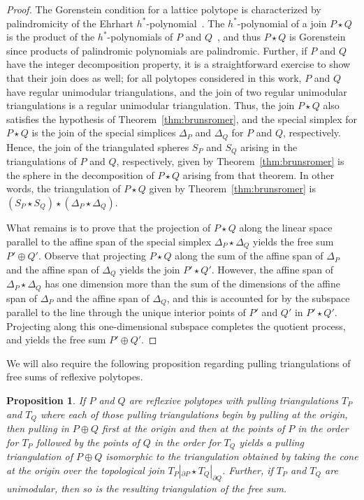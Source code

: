 \documentclass[12pt]{amsart}
\newtheorem{proposition}[theorem]{Proposition}
\theoremstyle{definition}
\begin{document}
\begin{proof}
The Gorenstein condition for a lattice polytope is characterized by palindromicity of the Ehrhart $h^*$-polynomial~\cite{stanleyhilbertgraded}.
The $h^*$-polynomial of a join $P\star Q$ is the product of the $h^*$-polynomials of $P$ and $Q$~\cite{BR07}, and thus $P\star Q$ is Gorenstein since products of palindromic polynomials are palindromic.
Further, if $P$ and $Q$ have the integer decomposition property, it is a straightforward exercise to show that their join does as well; for all polytopes considered in this work, $P$ and $Q$ have regular unimodular triangulations, and the join of two regular unimodular triangulations is a regular unimodular triangulation.
Thus, the join $P\star Q$ also satisfies the hypothesis of Theorem~\ref{thm:brunsromer}, and the special simplex for $P\star Q$ is the join of the special simplices $\Delta_P$ and $\Delta_Q$ for $P$ and $Q$, respectively.
Hence, the join of the triangulated spheres $S_P$ and $S_Q$ arising in the triangulations of $P$ and $Q$, respectively, given by Theorem~\ref{thm:brunsromer} is the sphere in the decomposition of $P\star Q$ arising from that theorem.
In other words, the triangulation of $P\star Q$ given by Theorem~\ref{thm:brunsromer} is $(S_P\star S_Q)\star (\Delta_P\star \Delta_Q)$.

What remains is to prove that the projection of $P\star Q$ along the linear space parallel to the affine span of the special simplex $\Delta_P\star \Delta_Q$ yields the free sum $P'\oplus Q'$.
Observe that projecting $P\star Q$ along the sum of the affine span of $\Delta_P$ and the affine span of $\Delta_Q$ yields the join $P'\star Q'$.
However, the affine span of $\Delta_P\star \Delta_Q$ has one dimension more than the sum of the dimensions of the affine span of $\Delta_P$ and the affine span of $\Delta_Q$, and this is accounted for by the subspace parallel to the line through the unique interior points of $P'$ and $Q'$ in $P'\star Q'$.
Projecting along this one-dimensional subspace completes the quotient process, and yields the free sum $P'\oplus Q'$.
\end{proof}

We will also require the following proposition regarding pulling triangulations of free sums of reflexive polytopes.

\begin{proposition}\label{prop:freesumpulling}
If $P$ and $Q$ are reflexive polytopes with pulling triangulations $T_P$ and $T_Q$ where each of those pulling triangulations begin by pulling at the origin, then pulling in $P\oplus Q$ first at the origin and then at the points of $P$ in the order for $T_P$ followed by the points of $Q$ in the order for $T_Q$ yields a pulling triangulation of $P\oplus Q$ isomorphic to the triangulation obtained by taking the cone at the origin over the topological join $T_P|_{\partial P}\star T_Q|_{\partial Q}$.
Further, if $T_P$ and $T_Q$ are unimodular, then so is the resulting triangulation of the free sum.
\end{proposition}
\end{document}
